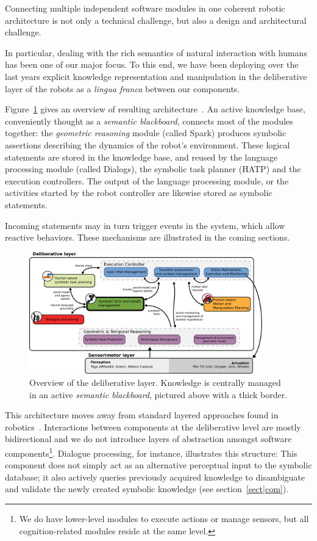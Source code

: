 \documentclass[preprint,3p,times]{elsarticle}
\begin{document}
Connecting multiple independent software modules in one coherent robotic
architecture is not only a technical challenge, but also a design and
architectural challenge.

In particular, dealing with the rich semantics of natural interaction with
humans has been one of our major focus. To this end, we have been deploying
over the last years explicit knowledge representation and manipulation in the
deliberative layer of the robots as a {\it lingua franca} between our
components.

Figure~\ref{fig|archi} gives an overview of resulting
architecture~\cite{Alami2011}. An active knowledge base, conveniently thought
as a \emph{semantic blackboard}, connects most of the modules together: the
\emph{geometric reasoning} module (called {\sc Spark}) produces symbolic
assertions describing the dynamics of the robot's environment. These logical
statements are stored in the knowledge base, and reused by the language
processing module (called {\sc Dialogs}), the symbolic task planner (HATP) and
the execution controllers. The output of the language processing module, or the
activities started by the robot controller are likewise stored as symbolic
statements.

Incoming statements may in turn trigger events in the system, which
allow reactive behaviors. These mechanisms are illustrated in the coming
sections.

\begin{figure}
        \centering
        \includegraphics[width=0.9\textwidth]{archi}
        \caption{Overview of the deliberative layer. Knowledge is
        centrally managed in an active \emph{semantic blackboard}, pictured
        above with a thick border.}
        \label{fig|archi}
\end{figure}


This architecture moves away from standard layered approaches found in
robotics~\cite{Gat1998three, Volpe2001CLARAty, Goldberg2002}. Interactions
between components at the deliberative level are mostly bidirectional and we do
not introduce layers of abstraction amongst software components\footnote{We do
have lower-level modules to execute actions or manage sensors, but all
cognition-related modules reside at the same level.}. Dialogue processing, for
instance, illustrates this structure: This component does not simply act as an
alternative perceptual input to the symbolic database; it also
actively queries previously acquired knowledge to disambiguate and validate the
newly created symbolic knowledge (see section~\ref{sect|com}).
\end{document}
